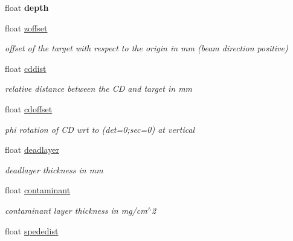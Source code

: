 \begin{DoxyCompactItemize}
\item 
\hypertarget{classg__clx_a55b2ad47323975fbefd70314a1580d26}{float {\bfseries depth}}\label{classg__clx_a55b2ad47323975fbefd70314a1580d26}

\item 
\hypertarget{classg__clx_a85780ae170aef9d5362a47520ee3a822}{float \hyperlink{classg__clx_a85780ae170aef9d5362a47520ee3a822}{zoffset}}\label{classg__clx_a85780ae170aef9d5362a47520ee3a822}

\begin{DoxyCompactList}\small\item\em offset of the target with respect to the origin in mm (beam direction positive) \end{DoxyCompactList}\item 
\hypertarget{classg__clx_af6483d6ed4f21d91fe1ac7e88393ab4e}{float \hyperlink{classg__clx_af6483d6ed4f21d91fe1ac7e88393ab4e}{cddist}}\label{classg__clx_af6483d6ed4f21d91fe1ac7e88393ab4e}

\begin{DoxyCompactList}\small\item\em relative distance between the C\-D and target in mm \end{DoxyCompactList}\item 
\hypertarget{classg__clx_a2f16d48f2601cfd6ccb100283f3cdab7}{float \hyperlink{classg__clx_a2f16d48f2601cfd6ccb100283f3cdab7}{cdoffset}}\label{classg__clx_a2f16d48f2601cfd6ccb100283f3cdab7}

\begin{DoxyCompactList}\small\item\em phi rotation of C\-D wrt to (det=0;sec=0) at vertical \end{DoxyCompactList}\item 
\hypertarget{classg__clx_a9868b722188e951233b134083dd63370}{float \hyperlink{classg__clx_a9868b722188e951233b134083dd63370}{deadlayer}}\label{classg__clx_a9868b722188e951233b134083dd63370}

\begin{DoxyCompactList}\small\item\em deadlayer thickness in mm \end{DoxyCompactList}\item 
\hypertarget{classg__clx_a9093a10412ab047b3b910e4c4a9d70d1}{float \hyperlink{classg__clx_a9093a10412ab047b3b910e4c4a9d70d1}{contaminant}}\label{classg__clx_a9093a10412ab047b3b910e4c4a9d70d1}

\begin{DoxyCompactList}\small\item\em contaminant layer thickness in mg/cm$^\wedge$2 \end{DoxyCompactList}\item 
\hypertarget{classg__clx_aca4cd80422665dab4188cbf82bb569ce}{float \hyperlink{classg__clx_aca4cd80422665dab4188cbf82bb569ce}{spededist}}\label{classg__clx_aca4cd80422665dab4188cbf82bb569ce}


\end{DoxyCompactItemize}

